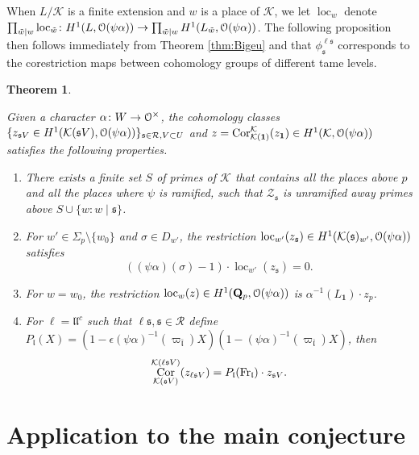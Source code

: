 \documentclass[leqno]{amsart}
\newtheorem{thm}{Theorem}[section]
\theoremstyle{definition}
\theoremstyle{remark}
\newcommand{\id}{\mathbf{1}}
\newcommand{\eo}{\EuScript{O}}
\newcommand{\Qp}{\mathbf{Q}_p}
\DeclareMathOperator{\Cor}{Cor}
\newcommand{\Fr}{\textnormal{Fr}} %
\newcommand{\fl}{\mathfrak{l}}
\newcommand{\fs}{\mathfrak{s}}
\newcommand{\K}{{\mathcal{K}}} %
\newcommand{\bl}{{\bar{\fl}}}
\DeclareMathOperator{\loc}{loc}
\begin{document}
When $L/\K$ is a finite extension and $w$ is a place of $\K$,
we let $\loc_w$ denote
$\prod_{\tilde{w}\mid w}\loc_{\tilde{w}}\colon 
H^1(L, \eo(\psi\alpha))\to 
\prod_{\tilde{w}\mid w}H^1(L_{\tilde{w}}, \eo(\psi\alpha))$.
The following proposition then follows immediately
from Theorem \ref{thm:Bigeu}
and that $\phi^{\ell\fs}_\fs$
corresponds to the corestriction maps
between cohomology groups of different tame levels.

\begin{thm}\label{thm:eu}

Given a character $\alpha\colon W\to \eo^\times$,
the cohomology classes
$\{ z_{\fs V}\in H^1(\K(\fs V), \eo(\psi\alpha))\}
_{\fs\in \mathcal{R},V\subset U}$
and $z=\Cor_{\K(\id)}^{\K}(z_\id)\in H^1(\K, \eo(\psi\alpha))$
satisfies the following properties. 


\begin{enumerate}
    \item There exists a finite set $S$ of primes of $\K$
    that contains all the places above $p$ and all the 
    places where $\psi$ is ramified, such that 
    $\mathcal{Z}_{\fs}$ is unramified away primes above
    $S\cup \{w\colon w\mid \fs\}$.
    \item For $w'\in \Sigma_p\setminus\{w_0\}$
    and $\sigma\in D_{w'}$, the restriction
    $\loc_{w'}(z_\fs)\in H^1(\K(\fs)_{w'}, \eo(\psi\alpha))$
    satisfies 
    \[
        ((\psi\alpha)(\sigma)-1)\cdot \loc_{w'}(z_\fs)=0.
    \]
    \item For $w=w_0$, the restriction 
    $\loc_{w}(z)\in H^1(\Qp, \eo(\psi\alpha))$
    is $\alpha^{-1}(L_\id)\cdot z_{p}$.
    \item
    For $\ell=\fl\fl^c$ such that $\ell\fs,\fs\in \mathcal{R}$ define
    $P_\fl(X)=(1-\epsilon(\psi\alpha)^{-1}(\varpi_\bl)X)
    (1-(\psi\alpha)^{-1}(\varpi_\bl)X)$, then
    \begin{equation}\label{eq:Pl}
        \Cor_{\K(\fs V)}^{\K(\ell\fs V)}(z_{\ell\fs V})=
        P_\fl(\Fr_\fl)\cdot z_{\fs V}.
    \end{equation}
\end{enumerate}

\end{thm}

\section{Application to the main conjecture}
\end{document}
